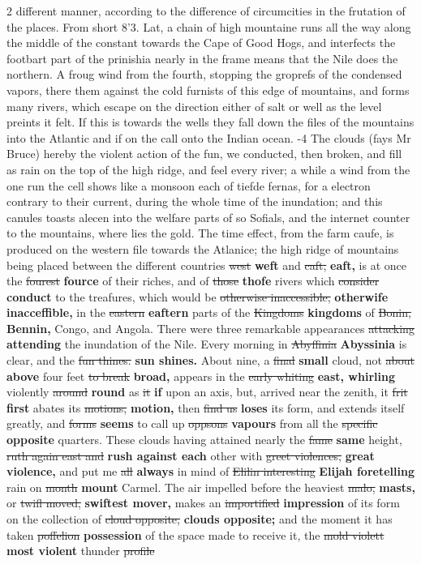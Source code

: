 \documentclass[10pt]{article}
\begin{document}
\begin{multicols}{2}
different manner, according to the difference of circumcities in the frutation of the places. From short 8’3. Lat, a chain of high mountaine runs all the way along the middle of the constant towards the Cape of Good Hogs, and interfects the footbart part of the prinishia nearly in the frame means that the Nile does the northern. A froug wind from the fourth, stopping the groprefs of the condensed vapors, there them against the cold furnists of this edge of mountains, and forms many rivers, which escape on the direction either of salt or well as the level preints it felt. If this is towards the wells they fall down the files of the mountains into the Atlantic and if on the call onto the Indian ocean. -4 The clouds (fays Mr Bruce) hereby the violent action of the fun, we conducted, then broken, and fill as rain on the top of the high ridge, and feel every river; a while a wind from the one run the cell shows like a monsoon each of tiefde fernas, for a electron contrary to their current, during the whole time of the inundation; and this canules toasts alecen into the welfare parts of so Sofials, and the internet counter to the mountains, where lies the gold. The time effect, from the farm caufe, is produced on the western file towards the Atlanice; the high ridge of mountains being placed between the different countries \sout{west} \textbf{weft} and \sout{caft,} \textbf{eaft,} is at once the \sout{fourest} \textbf{fource} of their riches, and of \sout{those} \textbf{thofe} rivers which \sout{consider} \textbf{conduct} to the treafures, which would be \sout{otherwise inaccessible,} \textbf{otherwife inacceffible,} in the \sout{eastern} \textbf{eaftern} parts of the \sout{Kingdoms} \textbf{kingdoms} of \sout{Bonin,} \textbf{Bennin,} Congo, and Angola. There were three remarkable appearances \sout{attacking} \textbf{attending} the inundation of the Nile. Every morning in \sout{Abyffinia} \textbf{Abyssinia} is clear, and the \sout{fun thines.} \textbf{sun shines.} About nine, a \sout{final} \textbf{small} cloud, not \sout{about} \textbf{above} four feet \sout{to break} \textbf{broad,} appears in the \sout{early whiting} \textbf{east, whirling} violently \sout{around} \textbf{round} as \sout{it} \textbf{if} upon an axis, but, arrived near the zenith, it \sout{frit} \textbf{first} abates its \sout{motions,} \textbf{motion,} then \sout{find us} \textbf{loses} its form, and extends itself greatly, and \sout{forms} \textbf{seems} to call up \sout{oppsons} \textbf{vapours} from all the \sout{specific} \textbf{opposite} quarters. These clouds having attained nearly the \sout{fame} \textbf{same} height, \sout{ruth again east and} \textbf{rush against each} other with \sout{greet violences,} \textbf{great violence,} and put me \sout{all} \textbf{always} in mind of \sout{Elilin interesting} \textbf{Elijah foretelling} rain on \sout{month} \textbf{mount} Carmel. The air impelled before the heaviest \sout{malo,} \textbf{masts,} or \sout{twifl moved,} \textbf{swiftest mover,} makes an \sout{importified} \textbf{impression} of its form on the collection of \sout{cloud opposite,} \textbf{clouds opposite;} and the moment it has taken \sout{poffelion} \textbf{possession} of the space made to receive it, the \sout{mold violett} \textbf{most violent} thunder \sout{profile} 
\end{multicols}
\end{document}
